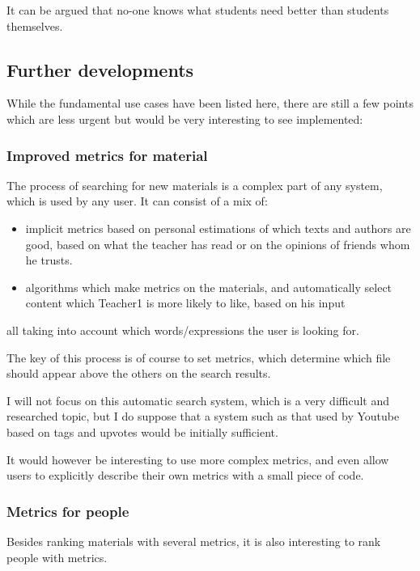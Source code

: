 \documentclass[12pt]{article}
\begin{document}
It can be argued that no-one knows what students need better than students themselves.

\subsection{Further developments} \label{further-developments}

While the fundamental use cases have been listed here, there are still a few points which are less urgent but would be very interesting to see implemented:

\subsubsection{Improved metrics for material}

The process of searching for new materials is a complex part of any system, which is used by any user. It can consist of a mix of:

\begin{itemize}
  \item implicit metrics based on personal estimations of which texts and authors are good, based on what the teacher has read or on the opinions of friends whom he trusts.
  \item algorithms which make metrics on the materials, and automatically select content which Teacher1 is more likely to like, based on his input
\end{itemize}

all taking into account which words/expressions the user is looking for.

The key of this process is of course to set metrics, which determine which file should appear above the others on the search results.

I will not focus on this automatic search system, which is a very difficult and researched topic, but I do suppose that a system such as that used by Youtube based on tags and upvotes would be initially sufficient.

It would however be interesting to use more complex metrics, and even allow users to explicitly describe their own metrics with a small piece of code.

\subsubsection{Metrics for people} \label{metrics-for-people}

Besides ranking materials with several metrics, it is also interesting to rank people with metrics.
\end{document}
